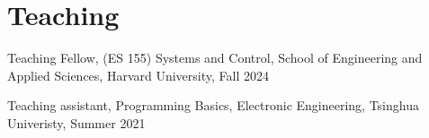 
\section{\mysidestyle Teaching}

Teaching Fellow, (ES 155) Systems and Control, School of Engineering and Applied Sciences, Harvard University, Fall 2024

Teaching assistant, Programming Basics, Electronic Engineering, Tsinghua Univeristy, Summer 2021